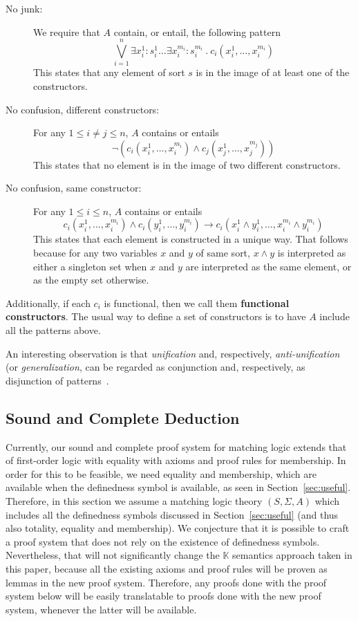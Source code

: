\documentclass[UTF8,11pt]{article}
\theoremstyle{plain}
\theoremstyle{definition}
\theoremstyle{remark}
\newcommand{\K}{\mbox{$\mathbb{K}$}\xspace}
\newcommand{\ra}{\rightarrow}
\begin{document}
\begin{description}
\item[No junk:]
We require that $A$ contain, or entail, the following pattern
$$
\bigvee_{i=1}^n \exists x_i^1:s_i^1\dots\exists x_i^{m_i}:s_i^{m_i}\ .\ 
c_i(x_i^1,\dots,x_i^{m_i})
$$
This states that any element of sort $s$ is in the image of at least one of
the constructors.
 
\item[No confusion, different constructors:]
For any $1 \leq i \neq j \leq n$, $A$ contains or entails
$$
\neg(c_i(x_i^1,\dots,x_i^{m_i}) \wedge c_j(x_j^1,\dots,x_j^{m_j}))
$$
This states that no element is in the image of two different constructors.
\item[No confusion, same constructor:] For any $1\leq i\leq n$, $A$ contains
or entails
$$
c_i(x_i^1,\dots,x_i^{m_i}) \wedge
c_i(y_i^1,\dots,y_i^{m_i}) \ra
c_i(x_i^1 \wedge y_i^1,\dots,x_i^{m_i}\wedge y_i^{m_i})
$$
This states that each element is constructed in a unique way.
That follows because for any two variables $x$ and $y$ of same sort,
$x \wedge y$ is interpreted as either a singleton set when $x$ and $y$
are interpreted as the same element, or as the empty set otherwise.
\end{description}
Additionally, if each $c_i$ is functional, then we call them
\textbf{functional constructors}.
The usual way to define a set of constructors is to have $A$
include all the patterns above.

An interesting observation is that \emph{unification} and, respectively,
\emph{anti-unification} (or \emph{generalization},
can be regarded as conjunction and, respectively, as disjunction of
patterns~\cite{rosu-2017-lmcs}.

\subsection{Sound and Complete Deduction}
\label{sec:deduction}

Currently, our sound and complete proof system for matching logic extends that
of first-order logic with equality with axioms and proof rules for membership.
In order for this to be feasible, we need equality and membership, which are
available when the definedness symbol is available, as seen in
Section~\ref{sec:useful}.
Therefore, in this section we assume a matching logic theory $(S,\Sigma,A)$
which includes all the definedness symbols discussed in Section~\ref{sec:useful}
(and thus also totality, equality and membership).
We conjecture that it is possible to craft a proof system that does not rely on
the existence of definedness symbols.
Nevertheless, that will not significantly change the \K semantics approach taken
in this paper, because all the existing axioms and proof rules will be proven as
lemmas in the new proof system.
Therefore, any proofs done with the proof system below will be easily translatable
to proofs done with the new proof system, whenever the latter will be available.
\end{document}
